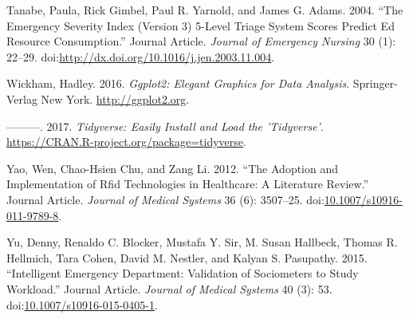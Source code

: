 \documentclass[]{elsarticle} %
\begin{document}
\hypertarget{ref-RN251}{}
Tanabe, Paula, Rick Gimbel, Paul R. Yarnold, and James G. Adams. 2004.
``The Emergency Severity Index (Version 3) 5-Level Triage System Scores
Predict Ed Resource Consumption.'' Journal Article. \emph{Journal of
Emergency Nursing} 30 (1): 22--29.
doi:\href{https://doi.org/http://dx.doi.org/10.1016/j.jen.2003.11.004}{http://dx.doi.org/10.1016/j.jen.2003.11.004}.

\hypertarget{ref-GGPLOT2}{}
Wickham, Hadley. 2016. \emph{Ggplot2: Elegant Graphics for Data
Analysis}. Springer-Verlag New York. \url{http://ggplot2.org}.

\hypertarget{ref-TIDY}{}
---------. 2017. \emph{Tidyverse: Easily Install and Load the
'Tidyverse'}. \url{https://CRAN.R-project.org/package=tidyverse}.

\hypertarget{ref-RN257}{}
Yao, Wen, Chao-Hsien Chu, and Zang Li. 2012. ``The Adoption and
Implementation of Rfid Technologies in Healthcare: A Literature
Review.'' Journal Article. \emph{Journal of Medical Systems} 36 (6):
3507--25.
doi:\href{https://doi.org/10.1007/s10916-011-9789-8}{10.1007/s10916-011-9789-8}.

\hypertarget{ref-RN253}{}
Yu, Denny, Renaldo C. Blocker, Mustafa Y. Sir, M. Susan Hallbeck, Thomas
R. Hellmich, Tara Cohen, David M. Nestler, and Kalyan S. Pasupathy.
2015. ``Intelligent Emergency Department: Validation of Sociometers to
Study Workload.'' Journal Article. \emph{Journal of Medical Systems} 40
(3): 53.
doi:\href{https://doi.org/10.1007/s10916-015-0405-1}{10.1007/s10916-015-0405-1}.
\end{document}
